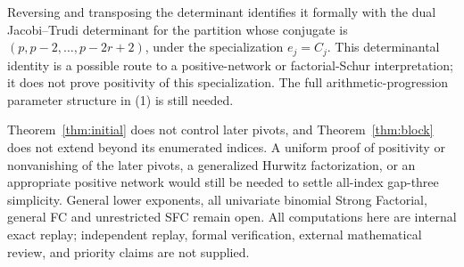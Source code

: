 \documentclass[11pt]{article}
\begin{document}
Reversing and transposing the determinant identifies it formally with
the dual Jacobi--Trudi determinant for the partition whose conjugate
is $(p,p-2,\ldots,p-2r+2)$, under the specialization $e_j=C_j$.
This determinantal identity is a possible route to a positive-network
or factorial-Schur interpretation; it does not prove positivity of
this specialization. The full arithmetic-progression parameter
structure in (1) is still needed.

Theorem~\ref{thm:initial} does not control later pivots, and
Theorem~\ref{thm:block} does not extend beyond its enumerated indices.
A uniform proof of positivity or nonvanishing of the later pivots,
a generalized Hurwitz factorization, or an appropriate positive network
would still be needed to settle all-index gap-three simplicity.
General lower exponents, all univariate binomial Strong Factorial,
general FC and unrestricted SFC remain open.
All computations here are internal exact replay; independent replay,
formal verification, external mathematical review, and priority claims
are not supplied.
\end{document}
